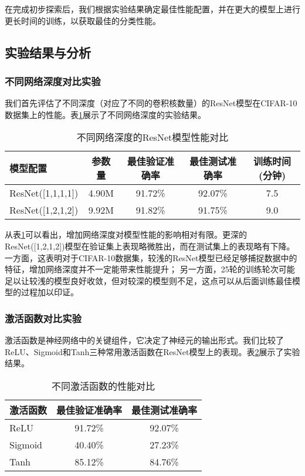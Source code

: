 \documentclass[12pt,a4paper]{article}
\begin{document}
在完成初步探索后，我们根据实验结果确定最佳性能配置，并在更大的模型上进行更长时间的训练，以获取最佳的分类性能。

\subsection{实验结果与分析}

\subsubsection{不同网络深度对比实验}

我们首先评估了不同深度（对应了不同的卷积核数量）的ResNet模型在CIFAR-10数据集上的性能。表\ref{tab:basic_model}展示了不同网络深度的实验结果。

\begin{table}[htbp]
\centering
\caption{不同网络深度的ResNet模型性能对比}
\label{tab:basic_model}
\begin{tabular}{lcccc}
\toprule
\textbf{模型配置} & \textbf{参数量} & \textbf{最佳验证准确率} & \textbf{最佳测试准确率} & \textbf{训练时间(分钟)} \\
\midrule
ResNet([1,1,1,1]) & 4.90M & 91.72\% & 92.07\% & 7.5 \\
ResNet([1,2,1,2]) & 9.92M & 91.82\% & 91.75\% & 9.0 \\
\bottomrule
\end{tabular}
\end{table}

从表\ref{tab:basic_model}可以看出，增加网络深度对模型性能的影响相对有限。更深的ResNet([1,2,1,2])模型在验证集上表现略微胜出，而在测试集上的表现略有下降。
一方面，这表明对于CIFAR-10数据集，较浅的ResNet模型已经足够捕捉数据中的特征，增加网络深度并不一定能带来性能提升；
另一方面，25轮的训练轮次可能足以让较浅的模型良好收敛，但对较深的模型则不足，这点可以从后面训练最佳模型的过程加以印证。

\subsubsection{激活函数对比实验}

激活函数是神经网络中的关键组件，它决定了神经元的输出形式。我们比较了ReLU、Sigmoid和Tanh三种常用激活函数在ResNet模型上的表现。表\ref{tab:activation_functions}展示了实验结果。

\begin{table}[htbp]
\centering
\caption{不同激活函数的性能对比}
\label{tab:activation_functions}
\begin{tabular}{lcc}
\toprule
\textbf{激活函数} & \textbf{最佳验证准确率} & \textbf{最佳测试准确率} \\
\midrule
ReLU & 91.72\% & 92.07\% \\
Sigmoid & 40.40\% & 27.23\% \\
Tanh & 85.12\% & 84.76\% \\
\bottomrule
\end{tabular}
\end{table}
\end{document}
